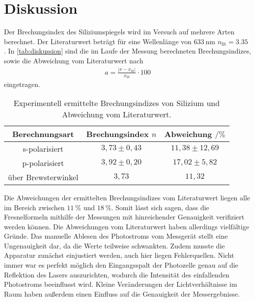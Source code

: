 \section{Diskussion}
\label{sec:Diskussion}

Der Brechungsindex des Siliziumspiegels wird im Versuch auf mehrere Arten berechnet.
Der Literaturwert beträgt für eine Wellenlänge von $\qty{633}{\nano\meter}$ $n_{\text{lit}}= 3.35$ \cite{BrechungSilizium}.
In \autoref{tab:diskussion} sind die im Laufe der Messung berechneten Brechungsindizes, sowie die Abweichung
vom Literaturwert nach 
\begin{align*}
    a=\frac{|x-x_{\text{lit}}|}{x_{\text{lit}}}\cdot 100 \label{eqn:abweich}
\end{align*}
eingetragen.

\begin{table}[H]
    \centering
    \caption{Experimentell ermittelte Brechungsindizes von Silizium und Abweichung vom Literaturwert.}
    \label{tab:diskussion}
    \begin{tabular}{c c c}
        \toprule
       {Berechnungsart}& {Brechungsindex $n$} & {Abweichung $ / \si{\percent}$} \\
        \midrule
        {s-polarisiert} & $3,73 \pm 0,43 $ & $11,38 \pm 12,69$ \\
        {p-polarisiert} & $3,92 \pm 0,20$ & $17,02 \pm 5,82 $ \\
        {über Brewsterwinkel} & $3,73$ & $11,32$ \\  
        \bottomrule
    \end{tabular}
  \end{table}

Die Abweichungen der ermittelten Brechungsindizes vom Literaturwert liegen alle im Bereich zwischen $\qty{11}{\percent}$ und $\qty{18}{\percent}$.
Somit lässt sich sagen, dass die Fresnelformeln mithilfe der Messungen mit hinreichender Genauigkeit verifiziert werden können.
Die Abweichungen vom Literaturwert haben allerdings vielfältige Gründe.
Das manuelle Ablesen des Photostroms vom Messgerät stellt eine Ungenauigkeit dar, da die Werte teilweise schwankten.
Zudem musste die Apparatur zunächst einjustiert werden, auch hier liegen Fehlerquellen.
Nicht immer war es perfekt möglich den Eingangsspalt der Photozelle genau auf die Reflektion des Lasers auszurichten, wodurch die Intensität des
einfallenden Photostroms beeinflusst wird.
Kleine Veränderungen der Lichtverhältnisse im Raum haben außerdem einen Einfluss auf die Genauigkeit der Messergebnisse.
\pagebreak

